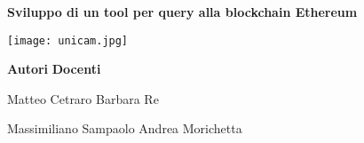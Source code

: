 \begin{center}

{\Huge \bfseries Sviluppo di un tool per query alla blockchain Ethereum}

\vspace{6cm}
\texttt{[image: unicam.jpg]}
\vspace{8cm}

{\bfseries Autori}\hspace{13.1cm} {\bfseries Docenti}

Matteo Cetraro \hspace{11.2cm} Barbara Re

Massimiliano Sampaolo \hspace{8.6cm} Andrea Morichetta

\end{center}